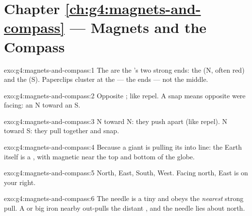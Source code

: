 \section*{Chapter \ref{ch:g4:magnets-and-compass} --- Magnets and the Compass}

\begin{solution}{exo:g4:magnets-and-compass:1}
The  are the 's two strong ends: the  (N,
often red) and the  (S). Paperclips cluster at the 
--- the ends --- not the middle.
\end{solution}

\begin{solution}{exo:g4:magnets-and-compass:2}
Opposite  ; like  repel. A snap means opposite
 were facing: an N toward an S.
\end{solution}

\begin{solution}{exo:g4:magnets-and-compass:3}
N toward N: they push apart (like  repel). N toward S: they
pull together and snap.
\end{solution}

\begin{solution}{exo:g4:magnets-and-compass:4}
Because a giant  is pulling its  into line: the Earth
itself is a , with magnetic  near the top and bottom of
the globe.
\end{solution}

\begin{solution}{exo:g4:magnets-and-compass:5}
North, East, South, West. Facing north, East is on your right.
\end{solution}

\begin{solution}{exo:g4:magnets-and-compass:6}
The needle is a tiny  and obeys the \emph{nearest} strong
pull. A  or big iron  nearby out-pulls the distant
, and the needle lies about north.
\end{solution}

